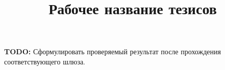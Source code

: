\documentclass[12pt,a4paper]{article}
\title{Рабочее название тезисов}
\author{}
\date{}
\newcommand{\ResultPending}[1]{\par\textbf{TODO:} #1\par}
\begin{document}
\maketitle
\ResultPending{Сформулировать проверяемый результат после прохождения соответствующего шлюза.}
\end{document}

